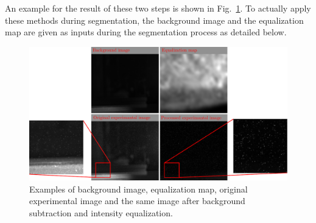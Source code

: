 \documentclass[10pt,a4paper]{article}
\begin{document}
%
An example for the result of these two steps is shown in Fig.~\ref{fig:image_preprocessing}. To actually apply these methods during segmentation, the background image and the equalization map are given as inputs during the segmentation process as detailed below. 



\begin{figure}[h]
	\centering
	\includegraphics[width=\textwidth]{image_preprocessing.pdf}
	\caption{Examples of background image, equalization map, original experimental image and the same image after background subtraction and intensity equalization.}
	\label{fig:image_preprocessing}  
\end{figure}
\end{document}
